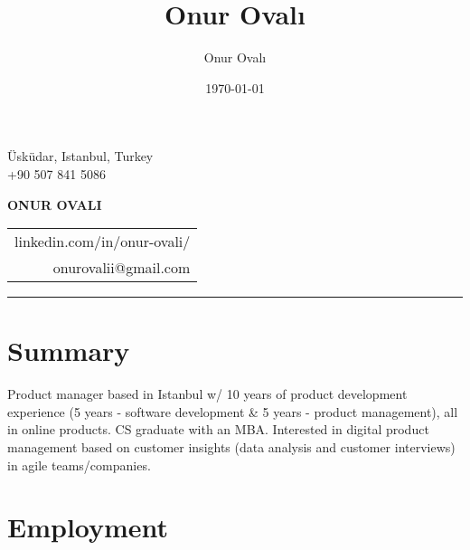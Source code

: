 \documentclass[11pt,twoside,a4paper]{article}
\title{Onur Ovalı}
\author{Onur Ovalı}
\date{\today}
\makeatletter
\newcommand\textbox[1]{%
  \parbox{.333\textwidth}{#1} %
}
\renewcommand\maketitle
{\noindent
 {\textbf{Üsküdar, Istanbul, Turkey}}%
 \medskip\par\noindent
 {\textbf{linkedin.com/in/onur-ovali}}%
 \hfill
 {\large\@date}%
 \bigskip\par\noindent
}
\makeatother
\begin{document}


  \noindent\textbox{Üsküdar, Istanbul, Turkey \\+90 507 841 5086\hfill}
  \textbox{\hfil\Large\bfseries ONUR OVALI\hfil}
  \textbox
    {\hfill \begin{tabular}[c]{r}
      linkedin.com/in/onur-ovali/ \\
      onurovalii@gmail.com
    \end{tabular}
    }

  \hrule

  \section{Summary}
    Product manager based in Istanbul w/ 10 years of product development experience (5 years - software development \& 5 years - product management), all in online products. CS graduate with an MBA. Interested in digital product management based on customer insights (data analysis and customer interviews) in agile teams/companies.

  \section{Employment}
\end{document}
